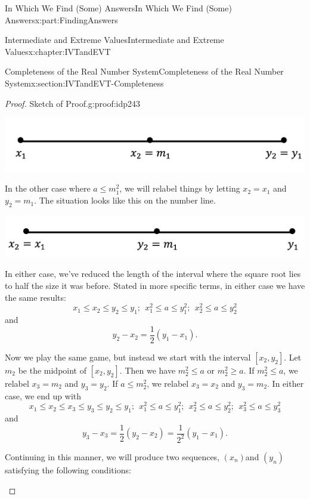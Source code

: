 \documentclass[oneside,10pt,]{book}
\numberwithin{equation}{section}
\begin{document}
\begin{partptx}{In Which We Find (Some) Answers}{}{In Which We Find (Some) Answers}{}{}{x:part:FindingAnswers}
\begin{chapterptx}{Intermediate and Extreme Values}{}{Intermediate and Extreme Values}{}{}{x:chapter:IVTandEVT}
\begin{sectionptx}{Completeness of the Real Number System}{}{Completeness of the Real Number System}{}{}{x:section:IVTandEVT-Completeness}
\begin{proof}{Sketch of Proof.}{g:proof:idp243}
\begin{image}{0.22}{0.56}{0.22}%
\includegraphics[width=\linewidth]{images/Ch6fig5.png}
\end{image}%
In the other case where \(a\leq m_1^2\), we will relabel things by letting \(x_2=x_1\) and \(y_2=m_1\). The situation looks like this on the number line.%
\begin{image}{0.22}{0.56}{0.22}%
\includegraphics[width=\linewidth]{images/Ch6fig6.png}
\end{image}%
In either case, we've reduced the length of the interval where the square root lies to half the size it was before. Stated in more specific terms, in either case we have the same results:%
\begin{equation*}
x_1\leq x_2\leq y_2\leq y_1;\ \  x_1^2\leq a\leq y_1^2;\ \  x_2^2\leq a\leq y_2^2
\end{equation*}
and%
\begin{equation*}
y_2-x_2=\frac{1}{2}\left(y_1-x_1\right)\text{.}
\end{equation*}
%
\par
Now we play the same game, but instead we start with the interval \([x_2,y_2]\). Let \(m_2\) be the midpoint of \([x_2,y_2]\). Then we have \(m_2^2\leq a\) or \(m_2^2\geq a\). If \(m_2^2\leq a\), we relabel \(x_3=m_2\) and \(y_3=y_2\). If \(a\leq m_2^2\), we relabel \(x_3=x_2\) and \(y_3=m_2\). In either case, we end up with%
\begin{equation*}
x_1\leq x_2\leq x_3\leq y_3\leq y_2\leq y_1;\ \   x_1^2\leq a\leq y_1^2;\ \  x_2^2\leq a\leq y_2^2;\ \   x_3^2\leq a\leq y_3^2
\end{equation*}
and%
\begin{equation*}
y_3-x_3=\frac{1}{2}\left(y_2-x_2\right)=\frac{1}{2^2}\left(y_1-x_1\right)\text{.}
\end{equation*}
%
\par
Continuing in this manner, we will produce two sequences, \(\left(x_n\right)\)and \(\left(y_n\right)\) satisfying the following conditions:%
\begin{enumerate}

\end{enumerate}
\end{proof}
\end{sectionptx}
\end{chapterptx}
\end{partptx}
\end{document}
